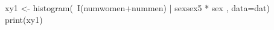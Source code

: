\begin{Schunk}
\begin{Sinput}
 xy1 <-
 histogram(~I(numwomen+nummen)  | sexsex5 * sex , data=dat)
 print(xy1)
\end{Sinput}
\end{Schunk}
